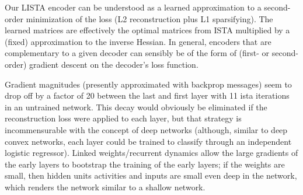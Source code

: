 \documentclass{article} %
\begin{document}
Our LISTA encoder can be understood as a learned approximation to a second-order minimization of the loss (L2 reconstruction plus L1 sparsifying).  The learned matrices are effectively the optimal matrices from ISTA multiplied by a (fixed) approximation to the inverse Hessian.  In general, encoders that are complementary to a given decoder can sensibly be of the form of (first- or second-order) gradient descent on the decoder's loss function. 

Gradient magnitudes (presently approximated with backprop messages) seem to drop off by a factor of 20 between the last and first layer with 11 ista iterations in an untrained network.  This decay would obviously be eliminated if the reconstruction loss were applied to each layer, but that strategy is incommensurable with the concept of deep networks (although, similar to deep convex networks, each layer could be trained to classify through an independent logistic regressor).  Linked weights/recurrent dynamics allow the large gradients of the early layers to bootstrap the training of the early layers; if the weights are small, then hidden units activities and inputs are small even deep in the network, which renders the network similar to a shallow network.







\end{document}

